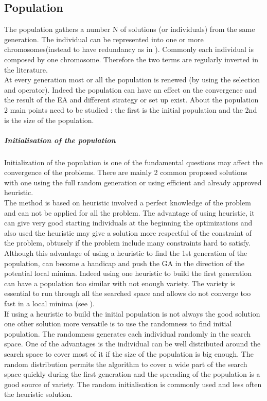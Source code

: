 \subsection{Population }\label{sec:Population}
The population gathers a number N of solutions (or individuals) from the same generation. The individual can be represented into one or  more chromosomes(instead to have redundancy as in \cite{ 121*ronald1997}). Commonly each individual is composed by one chromosome. Therefore the two terms are regularly inverted in the literature.\\
At every generation most or all the population is renewed (by using the selection and operator). Indeed the population can have an effect on the convergence and the result of the EA and different strategy or set up exist. About the population 2 main points need to be studied : the first is the initial population and the 2nd is the size of the population.  
\subparagraph{Initialisation of the population}\label{sec:initPOP}
Initialization of the population is one of the fundamental questions may affect the convergence of the problems. There are mainly 2 common proposed solutions with one using the full random generation or  using efficient and already approved heuristic.\\

 The method is based on heuristic involved a perfect knowledge  of the problem and can not be applied  for all the problem. The advantage of using heuristic, it can give very good starting individuals at the beginning the optimizations and also used the heuristic may give a solution more respectful of the constraint of the problem, obtusely if the problem include many constraints hard to satisfy. \\
Although this advantage of using a heuristic to find the 1st generation of the population, can become a handicap and push the GA in the direction of the potential local minima. Indeed using one heuristic to build the first generation can have a population too similar with not enough variety. The variety is essential to run through all the searched space and allows do not converge too fast in a local minima (see \citep{64*matsui1999}).\\

If using a heuristic to build the initial population is not always the good solution one other solution more versatile is to use the randomness to find initial population. The  randomness generates each individual randomly in the search space. One of the advantages is the individual can be well distributed around the search space to cover most of it  if the size of the population is big enough. 
The random  distribution permits the algorithm  to cover a wide part of the search space quickly during the first generation and the spreading of the population is a good source of variety.
The random initialisation is commonly used and less often the heuristic solution.

